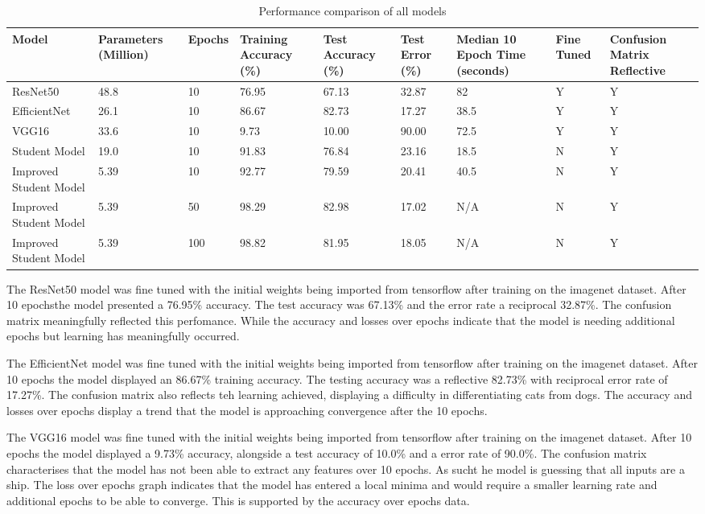 \documentclass[10pt,twocolumn,letterpaper]{article}
\begin{document}
\begin{table}[t]
\centering
\begin{tabular}{|L|L|L|L|L|L|L|L|L|}
\hline
\textbf{Model} & \textbf{Parameters (Million)} & \textbf{Epochs} & \textbf{Training Accuracy (\%)} & \textbf{Test Accuracy (\%)} & \textbf{Test Error (\%)} & \textbf{Median 10 Epoch Time (seconds)} & \textbf{Fine Tuned} & \textbf{Confusion Matrix Reflective} \\ \hline
ResNet50 & 48.8 & 10 & 76.95 & 67.13 & 32.87 & 82 & Y & Y \\ \hline
EfficientNet & 26.1 & 10 & 86.67 & 82.73 & 17.27 & 38.5 & Y & Y \\ \hline
VGG16 & 33.6 & 10 & 9.73 & 10.00 & 90.00 & 72.5 & Y & Y \\ \hline
Student Model & 19.0 & 10 & 91.83 & 76.84 & 23.16 & 18.5 & N & Y \\ \hline
Improved Student Model & 5.39 & 10 & 92.77 & 79.59 & 20.41 & 40.5 & N & Y \\ \hline
Improved Student Model & 5.39 & 50 & 98.29 & 82.98 & 17.02 & N/A & N & Y \\ \hline
Improved Student Model & 5.39 & 100 & 98.82 & 81.95 & 18.05 & N/A & N & Y \\ \hline
\end{tabular}
\caption{Performance comparison of all models}
\label{tab:model_performance}
\end{table}

The ResNet50 model was fine tuned with the initial weights being imported from tensorflow after training on the imagenet dataset. After 10 epochsthe model presented a 76.95\% accuracy. The test accuracy was 67.13\% and the error rate a reciprocal 32.87\%. The confusion matrix meaningfully reflected this perfomance. While the accuracy and losses over epochs indicate that the model is needing additional epochs but learning has meaningfully occurred. 

The EfficientNet model was fine tuned  with the initial weights being imported from tensorflow after training on the imagenet dataset. After 10 epochs the model displayed an 86.67\% training accuracy. The testing accuracy was a reflective 82.73\% with reciprocal error rate of 17.27\%. The confusion matrix also reflects teh learning achieved, displaying a difficulty in differentiating cats from dogs. The accuracy and losses over epochs display a trend that the model is approaching convergence after the 10 epochs. 

The VGG16 model was fine tuned with the initial weights being imported from tensorflow after training on the imagenet dataset. After 10 epochs the model displayed a 9.73\% accuracy, alongside a test accuracy of 10.0\% and a error rate of 90.0\%. The confusion matrix characterises that the model has not been able to extract any features over 10 epochs. As sucht he model is guessing that all inputs are a ship. The loss over epochs graph indicates that the model has entered a local minima and would require a smaller learning rate and additional epochs to be able to converge. This is supported by the accuracy over epochs data. 
\end{document}
